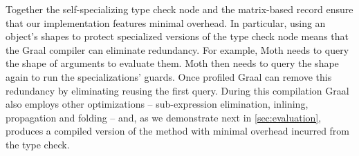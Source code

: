 Together the self-specializing type check node and the matrix-based record
ensure that our implementation features minimal overhead. 
In particular, using an object's shapes
to protect specialized versions of the type check node 
means that the Graal compiler can eliminate redundancy. For example,
Moth needs to query the shape of arguments to evaluate them.
Moth then needs to query the shape again to run the specializations' guards.
Once profiled Graal can remove this redundancy by eliminating
reusing the first query.
During this compilation Graal also employs other optimizations 
-- sub-expression elimination, inlining, propagation and folding --\tabularnewline
and, as we demonstrate next in \cref{sec:evaluation},
produces a compiled version of the method with minimal overhead incurred from
the type check.
